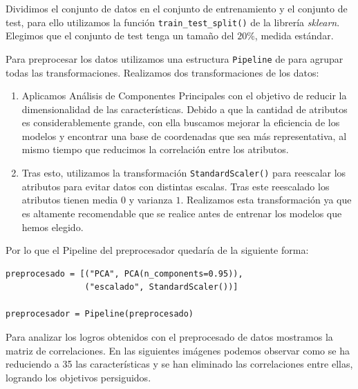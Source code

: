 \documentclass[size=a4, parskip=half, titlepage=false, toc=flat, toc=bib, 12pt]{scrartcl}
\begin{document}
Dividimos el conjunto de datos en el conjunto de entrenamiento y el conjunto de test, para ello utilizamos la función \verb|train_test_split()| de la librería \textit{sklearn}. Elegimos que el conjunto de test tenga un tamaño del $20\%$, medida estándar.

Para preprocesar los datos utilizamos una estructura \verb|Pipeline| de  para agrupar todas las transformaciones. Realizamos dos transformaciones de los datos:
\begin{enumerate}

\item Aplicamos Análisis de Componentes Principales con el objetivo de reducir la dimensionalidad de las características. Debido a que la cantidad de atributos es considerablemente grande, con ella buscamos mejorar la eficiencia de los modelos y encontrar una base de coordenadas que sea más representativa, al mismo tiempo que reducimos la correlación entre los atributos.

\item Tras esto, utilizamos la transformación \verb|StandardScaler()| para reescalar los atributos para evitar datos con distintas escalas. Tras este reescalado los atributos tienen media $0$ y varianza $1$. Realizamos esta transformación ya que es altamente recomendable que se realice antes de entrenar los modelos que hemos elegido.

\end{enumerate}
Por lo que el Pipeline del preprocesador quedaría de la siguiente forma:
\begin{verbatim}
preprocesado = [("PCA", PCA(n_components=0.95)),
                ("escalado", StandardScaler())]

preprocesador = Pipeline(preprocesado)
\end{verbatim}

Para analizar los logros obtenidos con el preprocesado de datos mostramos la matriz de correlaciones.  En las siguientes imágenes podemos observar como se ha reduciendo a 35 las características y se han eliminado las correlaciones entre ellas, logrando los objetivos persiguidos.
\end{document}
